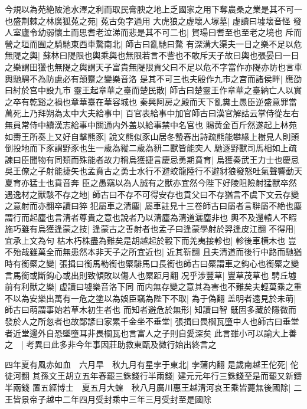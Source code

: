 今規以為苑絶陂池水澤之利而取民膏腴之地上乏國家之用下奪農桑之業是其不可一也盛荆棘之林廣狐菟之苑|{
	菟古兔字通用}
大虎狼之虚壞人塜墓|{
	虚讀曰墟壞音怪}
發人室廬令幼弱懷土而思耆老泣涕而悲是其不可二也|{
	賀瑒曰耆至也至老之境也}
斥而營之垣而囿之騎馳東西車騖南北|{
	師古曰亂馳曰騖}
有深溝大渠夫一日之樂不足以危無隄之輿|{
	蘇林曰隄限也輿乘輿也無限若言不訾也不敢斥天子故曰輿也張晏曰一日之樂謂田獵也無隄之輿謂天子富貴無隄限貢父曰不足以危不字當作亦隄亦防也言車輿馳騁不為防慮必有顛蹷之變樂音洛}
是其不可三也夫殷作九市之宫而諸侯畔|{
	應劭曰紂於宫中設九市}
靈王起章華之臺而楚民散|{
	師古曰楚靈王作章華之臺納亡人以實之卒有乾谿之禍也章華臺在華容城也}
秦興阿房之殿而天下亂糞土愚臣逆盛意罪當萬死上乃拜朔為太中大夫給事中|{
	百官表給事中加官師古曰漢官解詁云掌侍從左右無員常侍中續漢志給事中關通内外盖以給事禁中名官也}
賜黄金百斤然遂起上林苑如夀王所奏上又好自擊熊豕|{
	說文熊似豕山居冬蟄春出詩疏熊能攀緣上樹見人則顛倒投地而下豕謂野豕也生一歲為豵二歲為豜二獸皆能突人}
馳逐野獸司馬相如上疏諫曰臣聞物有同類而殊能者故力稱烏獲捷言慶忌勇期賁育|{
	烏獲秦武王力士也慶忌吳王僚之子射能捷矢也孟賁古之勇士水行不避蛟龍陸行不避豺狼發怒吐氣聲響動天夏育亦猛士也賁音奔}
臣之愚竊以為人誠有之獸亦宜然今陛下好陵阻險射猛獸卒然遇逸材之獸駭不存之地|{
	師古曰不存不可得安存也貢父曰不存猶言不虞下文云存變之意射而亦翻卒讀曰猝}
犯屬車之清塵|{
	屬車註見十三卷師古曰屬者言聨屬不絶也塵謂行而起塵也言清者尊貴之意也說者乃以清塵為清道灑塵非也}
輿不及還轅人不暇施巧雖有烏獲逢蒙之技|{
	逢蒙古之善射者也孟子曰逢蒙學射於羿逢皮江翻}
不得用|{
	宜承上文為句}
枯木朽株盡為難矣是胡越起於轂下而羌夷接軫也|{
	軫後車横木也}
豈不殆哉雖萬全而無患然本非天子之所宜近也|{
	近其靳翻}
且夫清道而後行中路而馳猶時有銜橜之變|{
	張揖曰銜馬勒銜也橜騑馬口長銜也師古曰橜謂車之鈎心也銜橜之變言馬銜或斷鈎心或出則致傾敗以傷人也橜距月翻}
况乎涉豐草|{
	豐草茂草也}
騁丘墟前有利獸之樂|{
	虚讀曰墟樂音洛下同}
而内無存變之意其為害也不難矣夫輕萬乘之重不以為安樂出萬有一危之塗以為娛臣竊為陛下不取|{
	為于偽翻}
盖明者遠見於未萌|{
	師古曰萌謂事始若草木初生者也}
而知者避危於無形|{
	知讀曰智}
旤固多藏於隱微而發於人之所忽者也故鄙諺曰家累千金坐不垂堂|{
	張揖曰畏櫩瓦墮中人也師古曰垂堂者近堂邊外自恐墜墮耳非畏櫩瓦也言富人之子則自愛深矣}
此言雖小可以諭大上善之　|{
	考異曰此多非今年事因莊助救東甌及微行始出終言之}


四年夏有風赤如血　六月旱　秋九月有星孛于東北|{
	孛蒲内翻}
是歲南越王佗死|{
	佗徒河翻}
其孫文王胡立五年春罷三銖錢行半兩錢|{
	建元元年行三銖錢至是而罷又新鑄半兩錢}
置五經博士　夏五月大蝗　秋八月廣川惠王越清河哀王乘皆薨無後國除|{
	二王皆景帝子越中二年四月受封乘中三年三月受封至是國除}


